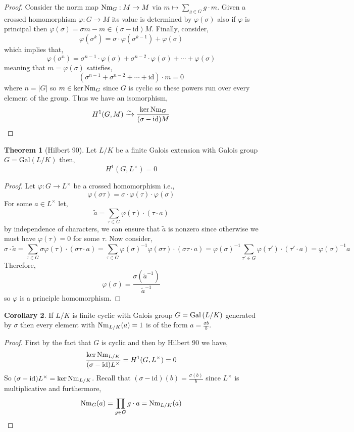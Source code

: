 \documentclass[12pt]{extarticle}
\newcommand{\id}{\mathrm{id}}
\theoremstyle{definition}
\newtheorem{theorem}{Theorem}[section]
\newtheorem{corollary}[theorem]{Corollary}
\begin{document}
\begin{proof}
Consider the norm map $\mathrm{Nm}_G : M \to M$ via $m \mapsto \sum\limits_{g \in G} g \cdot m$. Given a crossed homomorphism $\varphi : G \to M$ its value is determined by $\varphi(\sigma)$
also if $\varphi$ is principal then $\varphi(\sigma) = \sigma m - m \in (\sigma - \id)M$. Finally, consider,
\[ \varphi(\sigma^k) = \sigma \cdot \varphi(\sigma^{k-1}) + \varphi(\sigma) \]
which implies that,
\[ \varphi(\sigma^n) = \sigma^{n-1} \cdot \varphi(\sigma) + \sigma^{n-2} \cdot \varphi(\sigma) + \cdots + \varphi(\sigma) \]
meaning that $m = \varphi(\sigma)$ satisfies,
\[ (\sigma^{n-1} + \sigma^{n-2} + \cdots + \id) \cdot m = 0 \]
where $n = |G|$ so $m \in \ker{\mathrm{Nm}_G}$ since $G$ is cyclic so these powers run over every element of the group. Thus we have an isomorphism,
\[ H^1(G, M) \xrightarrow{\sim} \frac{\ker{\Nm_G}}{(\sigma - \id)M} \]
\end{proof}

\begin{theorem}[Hilbert 90]
Let $L/K$ be a finite Galois extension with Galois group $G = \mathrm{Gal}(L/K)$ then,
\[ H^1(G, L^\times) = 0 \]
\end{theorem}

\begin{proof}
Let $\varphi : G \to L^\times$ be a crossed homomorphism i.e.,
\[ \varphi(\sigma \tau) = \sigma \cdot \varphi(\tau) \cdot \varphi(\sigma) \]
For some $a \in L^\times$ let,
\[ \tilde{a} = \sum_{\tau \in G} \varphi(\tau) \cdot (\tau \cdot a) \]
by independence of characters, we can ensure that $\tilde{a}$ is nonzero since otherwise we must have $\varphi(\tau) = 0$ for some $\tau$. 
Now consider,
\[ \sigma \cdot \tilde{a} = \sum_{\tau \in G} \sigma \varphi(\tau) \cdot (\sigma \tau \cdot a) = \sum_{\tau \in G} \varphi(\sigma)^{-1} \varphi(\sigma \tau) \cdot (\sigma \tau \cdot a) = \varphi(\sigma)^{-1} \sum_{\tau' \in G} \varphi(\tau') \cdot (\tau' \cdot a) = \varphi(\sigma)^{-1} a  \]
Therefore,
\[ \varphi(\sigma) = \frac{\sigma (\tilde{a}^{-1})}{\tilde{a}^{-1}} \]
so $\varphi$ is a principle homomorphism. 
\end{proof}

\begin{corollary}
If $L / K$ is finite cyclic with Galois group $G = \mathrm{Gal}\left( L/K \right)$ generated by $\sigma$ then every element with $\mathrm{Nm}_{L/K} (a) = 1$ is of the form $a = \frac{\sigma b}{b}$. 
\end{corollary}

\begin{proof}
First by the fact that $G$ is cyclic and then by Hilbert 90 we have,
\[ \frac{\ker{\Nm_{L/K}}}{(\sigma - \id)L^\times} = H^1(G, L^\times) = 0 \]
So $(\sigma - \id) L^\times = \ker{\Nm_{L/K}}$. Recall that $(\sigma - \id)(b) = \frac{\sigma(b)}{b}$ since $L^\times$ is multiplicative and furthermore,
\[ \mathrm{Nm}_{G}(a) = \prod_{g \in G} g \cdot a  = \mathrm{Nm}_{L/K}(a) \]
\end{proof}
\end{document}
